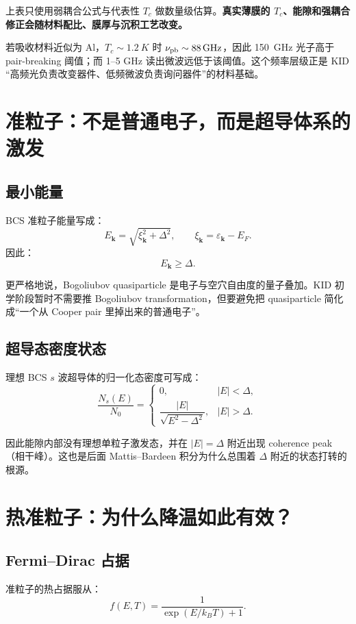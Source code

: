 \documentclass[11pt,a4paper,openany]{ctexrep}
\begin{document}
\noindent
上表只使用弱耦合公式与代表性 $T_c$ 做数量级估算。\textbf{真实薄膜的 $T_c$、能隙和强耦合修正会随材料配比、膜厚与沉积工艺改变。}

\begin{projectbox}
若吸收材料近似为 Al，$T_c\sim\SI{1.2}{K}$ 时 $\nu_{\rm pb}\sim\SI{88}{GHz}$，因此 \SI{150}{GHz} 光子高于 pair-breaking 阈值；而 1--5 GHz 读出微波远低于该阈值。这个频率层级正是 KID “高频光负责改变器件、低频微波负责询问器件”的材料基础。
\end{projectbox}

\section{准粒子：不是普通电子，而是超导体系的激发}

\subsection{最小能量}
BCS 准粒子能量写成：
\[
\boxed{
E_{\mathbf{k}}=\sqrt{\xi_{\mathbf{k}}^2+\Delta^2},
\qquad
\xi_{\mathbf{k}}=\varepsilon_{\mathbf{k}}-E_F.
}
\]
因此：
\[
E_{\mathbf{k}}\ge\Delta.
\]

更严格地说，Bogoliubov quasiparticle 是电子与空穴自由度的量子叠加。KID 初学阶段暂时不需要推 Bogoliubov transformation，但要避免把 quasiparticle 简化成“一个从 Cooper pair 里掉出来的普通电子”。

\subsection{超导态密度状态}
理想 BCS $s$ 波超导体的归一化态密度可写成：
\[
\frac{N_s(E)}{N_0}
=
\begin{cases}
0, & |E|<\Delta,\\[0.4em]
\dfrac{|E|}{\sqrt{E^2-\Delta^2}}, & |E|>\Delta.
\end{cases}
\]

因此能隙内部没有理想单粒子激发态，并在 $|E|=\Delta$ 附近出现 coherence peak（相干峰）。这也是后面 Mattis--Bardeen 积分为什么总围着 $\Delta$ 附近的状态打转的根源。

\section{热准粒子：为什么降温如此有效？}

\subsection{Fermi--Dirac 占据}
准粒子的热占据服从：
\[
f(E,T)=\frac{1}{\exp(E/k_BT)+1}.
\]
\end{document}
